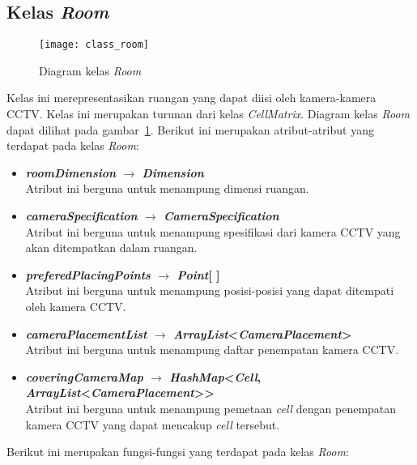 \subsection{Kelas \textit{Room}}
\begin{figure}[H]
	\centering  
	\texttt{[image: class\_room]}
	\caption[Diagram kelas \textit{Room}]{Diagram kelas \textit{Room}}
	\label{fig:class_room}
\end{figure}

Kelas ini merepresentasikan ruangan yang dapat diisi oleh kamera-kamera CCTV. Kelas ini merupakan turunan dari kelas \textit{CellMatrix}. Diagram kelas \textit{Room} dapat dilihat pada gambar~\ref{fig:class_room}. Berikut ini merupakan atribut-atribut yang terdapat pada kelas \textit{Room}:
\begin{itemize}
	\item \textbf{\textit{roomDimension} \(\rightarrow\) \textit{Dimension}}\\
	Atribut ini berguna untuk menampung dimensi ruangan.
	\item \textbf{\textit{cameraSpecification} \(\rightarrow\) \textit{CameraSpecification}}\\
	Atribut ini berguna untuk menampung spesifikasi dari kamera CCTV yang akan ditempatkan dalam ruangan.
	\item \textbf{\textit{preferedPlacingPoints} \(\rightarrow\) \textit{Point}[ ]}\\
	Atribut ini berguna untuk menampung posisi-posisi yang dapat ditempati oleh kamera CCTV.
	\item \textbf{\textit{cameraPlacementList} \(\rightarrow\) \textit{ArrayList}<\textit{CameraPlacement}>}\\
	Atribut ini berguna untuk menampung daftar penempatan kamera CCTV.
	\item \textbf{\textit{coveringCameraMap} \(\rightarrow\) \textit{HashMap}<\textit{Cell}, \textit{ArrayList}{<\textit{CameraPlacement}>}>}\\
	Atribut ini berguna untuk menampung pemetaan \textit{cell} dengan penempatan kamera CCTV yang dapat mencakup \textit{cell} tersebut.
\end{itemize}
Berikut ini merupakan fungsi-fungsi yang terdapat pada kelas \textit{Room}:
